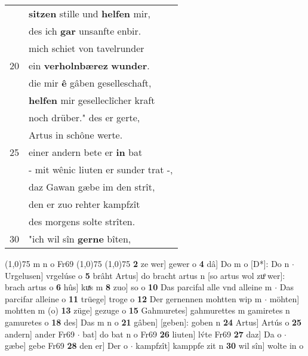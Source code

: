 \documentclass[8pt,a4paper,notitlepage]{article}
\begin{document}
\begin{table}[ht]
\begin{minipage}[t]{0.5\linewidth}
\begin{tabular}{rl}
 & \textbf{sitzen} stille und \textbf{helfen} mir,\\ 
 & des ich \textbf{gar} unsanfte enbir.\\ 
 & mich schiet von tavelrunder\\ 
20 & ein \textbf{verholnbærez} \textbf{wunder}.\\ 
 & die mir \textbf{ê} gâben geselleschaft,\\ 
 & \textbf{helfen} mir geselleclîcher kraft\\ 
 & noch drüber." des er gerte,\\ 
 & Artus in schône werte.\\ 
25 & einer andern bete er \textbf{in} bat\\ 
 & - mit wênic liuten er sunder trat -,\\ 
 & daz Gawan gæbe im den strît,\\ 
 & den er zuo rehter kampfzît\\ 
 & des morgens solte strîten.\\ 
30 & "ich wil sîn \textbf{gerne} bîten,\\ 
\end{tabular}
\scriptsize
\line(1,0){75} \newline
m n o Fr69 \newline
\line(1,0){75} \newline
\newline
\line(1,0){75} \newline
\textbf{2} ze wer] gewer o \textbf{4} dâ] Do m o [D*]: Do n  $\cdot$ Urgelusen] vrgelúse o \textbf{5} brâht Artus] do bracht artus n [so artus wol zuͦ wer]: brach artus o \textbf{6} hûs] kuͯs m \textbf{8} zuo] so o \textbf{10} Das parcifal alle vnd alleine m  $\cdot$ Das parcifar alleine o \textbf{11} trüege] troge o \textbf{12} Der gernennen mohtten wip m  $\cdot$ möhten] mohtten m (o) \textbf{13} züge] gezuge o \textbf{15} Gahmuretes] gahmurettes m gamiretes n gamuretes o \textbf{18} des] Das m n o \textbf{21} gâben] [geben]: goben n \textbf{24} Artus] Artús o \textbf{25} andern] ander Fr69  $\cdot$ bat] do bat n o Fr69 \textbf{26} liuten] lv́te Fr69 \textbf{27} daz] Da o  $\cdot$ gæbe] gebe Fr69 \textbf{28} den er] Der o  $\cdot$ kampfzît] kamppfe zit n \textbf{30} wil sîn] wolte in o \newline
\end{minipage}
\end{table}
\newpage
\end{document}
